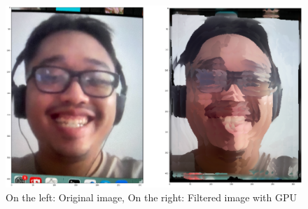 \documentclass[a4paper,11pt]{article}
\theoremstyle{mytheor}
\begin{document}
\begin{figure}[h]
    \centering
    \includegraphics[width=1\textwidth]{images/GPU.png}
    \caption{On the left: Original image, On the right: Filtered image with GPU}
    \label{fig:GPU}
\end{figure}
\end{document}
